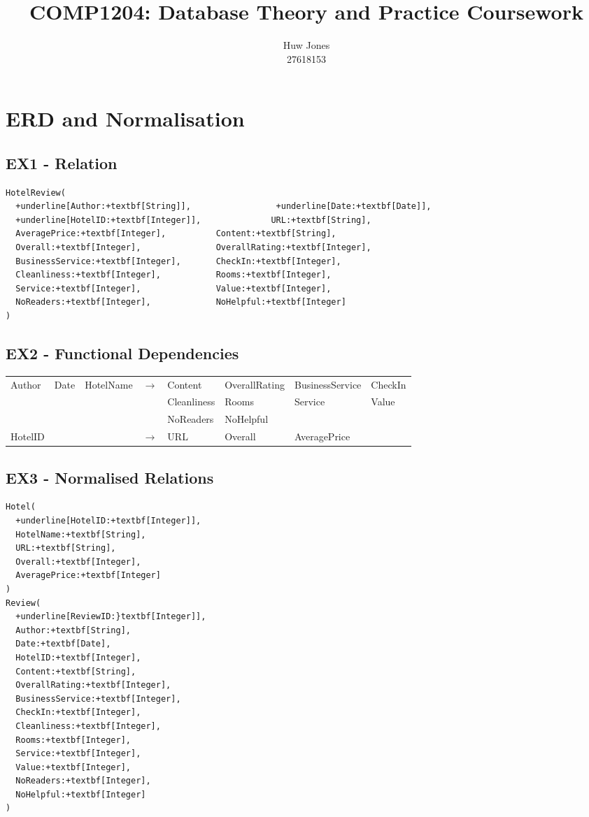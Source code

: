 \documentclass[a4paper]{article}
\author{Huw Jones \\27618153}
\title{COMP1204: Database Theory and Practice Coursework}
\begin{document}
\maketitle

\section{ERD and Normalisation}
\subsection{EX1 - Relation}
\begin{Verbatim}[commandchars=+\[\]]
HotelReview(
  +underline[Author:+textbf[String]],                 +underline[Date:+textbf[Date]],
  +underline[HotelID:+textbf[Integer]],              URL:+textbf[String],
  AveragePrice:+textbf[Integer],          Content:+textbf[String],
  Overall:+textbf[Integer],               OverallRating:+textbf[Integer],
  BusinessService:+textbf[Integer],       CheckIn:+textbf[Integer],
  Cleanliness:+textbf[Integer],           Rooms:+textbf[Integer],
  Service:+textbf[Integer],               Value:+textbf[Integer],
  NoReaders:+textbf[Integer],             NoHelpful:+textbf[Integer]
)
\end{Verbatim}

\subsection{EX2 - Functional Dependencies}
\begin{tabular}{l l l c l l l l}
Author & Date & HotelName & $\to$ & Content & OverallRating & BusinessService & CheckIn \\
&&&& Cleanliness & Rooms & Service & Value \\
&&&& NoReaders & NoHelpful & & \\
HotelID & & & $\to$ & URL & Overall & AveragePrice & \\
\end{tabular}

\subsection{EX3 - Normalised Relations}
\begin{Verbatim}[commandchars=+\[\]]
Hotel(
  +underline[HotelID:+textbf[Integer]],
  HotelName:+textbf[String],
  URL:+textbf[String],
  Overall:+textbf[Integer],
  AveragePrice:+textbf[Integer]
)
Review(
  +underline[ReviewID:}textbf[Integer]],
  Author:+textbf[String],
  Date:+textbf[Date],
  HotelID:+textbf[Integer],
  Content:+textbf[String],
  OverallRating:+textbf[Integer],
  BusinessService:+textbf[Integer],
  CheckIn:+textbf[Integer],
  Cleanliness:+textbf[Integer],
  Rooms:+textbf[Integer],
  Service:+textbf[Integer],
  Value:+textbf[Integer],
  NoReaders:+textbf[Integer],
  NoHelpful:+textbf[Integer]
)
\end{Verbatim}
\end{document}
